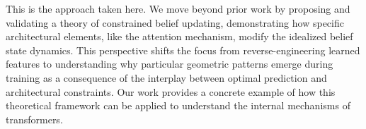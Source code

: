 This is the approach taken 
here. %
We move beyond prior work by proposing and validating a theory of constrained belief updating, demonstrating how specific architectural elements, like the attention mechanism, modify the idealized belief state dynamics. This perspective shifts the focus from reverse-engineering learned features to understanding why particular geometric patterns emerge during training as a consequence of the interplay between optimal prediction and architectural constraints. Our work provides a concrete example of how this theoretical framework can be applied to understand the internal mechanisms of transformers.